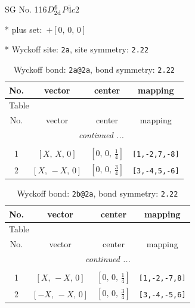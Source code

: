 \documentclass[fleqn,8pt]{jsarticle}
\begin{document}
\setcounter{MaxMatrixCols}{32}

\renewcommand{\tablename}{Table~}
\renewcommand{\figurename}{Figure~}
\begin{center}
\LARGE
SG No. 116\quad$D_{\rm 2d}^{6}$\quad$P\bar{4}c2$\quad[ tetragonal ]
\end{center}

* plus set:\,\,\,$+\left[ 0,\, 0,\, 0 \right]$


* Wyckoff site: {\tt 2a}, site symmetry: {\tt 2.22}
\renewcommand{\arraystretch}{1.2}
\begin{longtable}{cccc}
\caption{Wyckoff bond: {\tt 2a@2a}, bond symmetry: {\tt 2.22}}
 \\
 \hline \hline
No. & vector & center & mapping \\ \hline \endfirsthead

\multicolumn{3}{l}{\tablename\ \thetable{}} \\
 \hline \hline
No. & vector & center & mapping \\ \hline \endhead

 \hline \hline
\multicolumn{3}{r}{\footnotesize\it continued ...} \\ \endfoot

 \hline \hline
\multicolumn{3}{r}{} \\ \endlastfoot

1 & $\left[ X,\, X,\, 0 \right]$ & $\left[ 0,\, 0,\, \frac{1}{4} \right]$ & {\tt [1,-2,7,-8]} \\ \hline
2 & $\left[ X,\, - X,\, 0 \right]$ & $\left[ 0,\, 0,\, \frac{3}{4} \right]$ & {\tt [3,-4,5,-6]} \\
\end{longtable}
\renewcommand{\arraystretch}{1.2}
\begin{longtable}{cccc}
\caption{Wyckoff bond: {\tt 2b@2a}, bond symmetry: {\tt 2.22}}
 \\
 \hline \hline
No. & vector & center & mapping \\ \hline \endfirsthead

\multicolumn{3}{l}{\tablename\ \thetable{}} \\
 \hline \hline
No. & vector & center & mapping \\ \hline \endhead

 \hline \hline
\multicolumn{3}{r}{\footnotesize\it continued ...} \\ \endfoot

 \hline \hline
\multicolumn{3}{r}{} \\ \endlastfoot

1 & $\left[ X,\, - X,\, 0 \right]$ & $\left[ 0,\, 0,\, \frac{1}{4} \right]$ & {\tt [1,-2,-7,8]} \\ \hline
2 & $\left[ - X,\, - X,\, 0 \right]$ & $\left[ 0,\, 0,\, \frac{3}{4} \right]$ & {\tt [3,-4,-5,6]} \\
\end{longtable}
\end{document}
